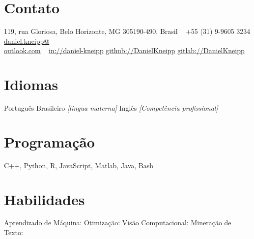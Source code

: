 \documentclass[a4paper]{cv-friggeri-x}
\begin{document}


\begin{aside} %
\section{Contato}
\pin \hfill 119, rua Gloriosa,
Belo Horizonte, MG 
305190-490, Brasil
~
{\Large\textcolor{gray}{\Mobilefone}} \hfill +55 (31) 9-9605 3234
{\Large\textcolor{gray}{\Letter}} \hfill \href{mailto:daniel.kneipp@outlook.com}{daniel.kneipp@\\outlook.com}
~
\llogo \hfill \href{https://www.linkedin.com/in/daniel-kneipp/}{in://daniel-kneipp}
\githublogo \hfill \href{https://github.com/DanielKneipp}{github://DanielKneipp}
\gitlablogo \hfill \href{https://gitlab.com/DanielKneipp}{gitlab://DanielKneipp}
\section{Idiomas}
Português Brasileiro \hspace{5mm}\null
\textit{\footnotesize{[língua materna]}}
Inglês  \hspace{5mm}\null
\textit{\footnotesize{[Competência profissional]}}
\section{Programação}
C++, Python, R, JavaScript,
Matlab, Java, Bash
~
\section{Habilidades}
Aprendizado \hspace{5mm}\null
de Máquina: \hspace{5mm}\null
{} 
Otimização:     \hspace{5mm}\null  
{}
Visão Computacional:  \hspace{5mm}\null
{}
Mineração de Texto:      \hspace{5mm}\null
{}
\end{aside}
\end{document}
